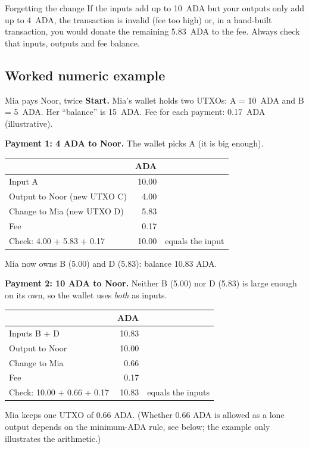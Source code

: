 \begin{warningbox}{Forgetting the change}
If the inputs add up to 10~ADA but your outputs only add up to 4~ADA, the transaction is invalid (fee too high) or, in a hand-built transaction, you would donate the remaining 5.83~ADA to the fee. Always check that inputs, outputs and fee balance.
\end{warningbox}

\subsection{Worked numeric example}

\begin{examplebox}{Mia pays Noor, twice}
\textbf{Start.} Mia's wallet holds two UTXOs: A = 10~ADA and B = 5~ADA. Her ``balance'' is 15~ADA. Fee for each payment: 0.17~ADA (illustrative).

\medskip
\textbf{Payment 1: 4 ADA to Noor.} The wallet picks A (it is big enough).
\begin{center}
\small
\begin{tabular}{@{}lrl@{}}
\toprule
 & ADA & \\
\midrule
Input A & 10.00 & \\
Output to Noor (new UTXO C) & 4.00 & \\
Change to Mia (new UTXO D) & 5.83 & \\
Fee & 0.17 & \\
\midrule
Check: 4.00 + 5.83 + 0.17 & 10.00 & equals the input \\
\bottomrule
\end{tabular}
\end{center}
Mia now owns B (5.00) and D (5.83): balance 10.83 ADA.

\medskip
\textbf{Payment 2: 10 ADA to Noor.} Neither B (5.00) nor D (5.83) is large enough on its own, so the wallet uses \emph{both} as inputs.
\begin{center}
\small
\begin{tabular}{@{}lrl@{}}
\toprule
 & ADA & \\
\midrule
Inputs B + D & 10.83 & \\
Output to Noor & 10.00 & \\
Change to Mia & 0.66 & \\
Fee & 0.17 & \\
\midrule
Check: 10.00 + 0.66 + 0.17 & 10.83 & equals the inputs \\
\bottomrule
\end{tabular}
\end{center}
Mia keeps one UTXO of 0.66 ADA. (Whether 0.66 ADA is allowed as a lone output depends on the minimum-ADA rule, see below; the example only illustrates the arithmetic.)
\end{examplebox}

